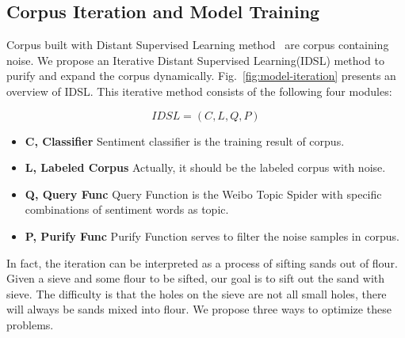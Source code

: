 \documentclass[runningheads]{llncs}
\begin{document}
\subsection{Corpus Iteration and Model Training}
Corpus built with Distant Supervised Learning method~\cite{go2009twitter,iosifidis2017large} are corpus containing noise. We propose an Iterative Distant Supervised Learning(IDSL) method to purify and expand the corpus dynamically. Fig.~\ref{fig:model-iteration} presents an overview of IDSL. This iterative method consists of the following four modules:


\begin{equation} 
IDSL = (C, L, Q, P)
\end{equation}

\begin{itemize}

\item \textbf{C, Classifier} Sentiment classifier is the training result of corpus. 

\item \textbf{L, Labeled Corpus} Actually, it should be the labeled corpus with noise.

\item \textbf{Q, Query Func} Query Function is the Weibo Topic Spider with specific combinations of sentiment words as topic.

\item \textbf{P, Purify Func} Purify Function serves to filter the noise samples in corpus.

\end{itemize}


In fact, the iteration can be interpreted as a process of sifting sands out of flour. Given a sieve and some flour to be sifted, our goal is to sift out the sand with sieve. The difficulty is that the holes on the sieve are not all small holes, there will always be sands mixed into flour. We propose three ways to optimize these problems. 
\end{document}
